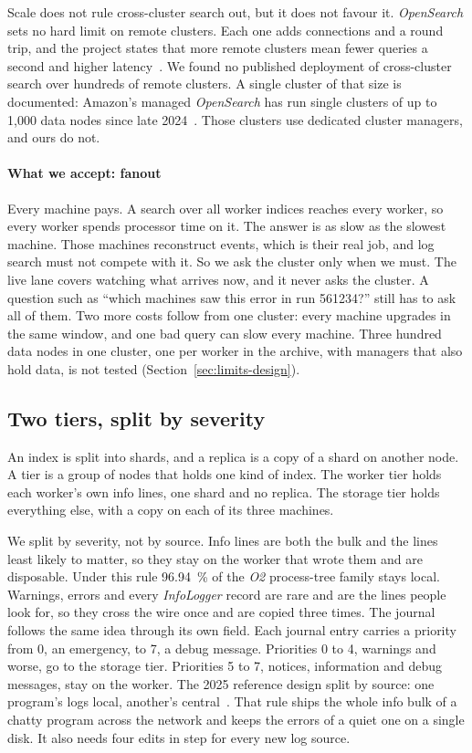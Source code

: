 Scale does not rule cross-cluster search out, but it does not favour it. \textit{OpenSearch} sets no hard limit on remote clusters. Each one adds connections and a round trip, and the project states that more remote clusters mean fewer queries a second and higher latency~\cite{ref:ccsforum}. We found no published deployment of cross-cluster search over hundreds of remote clusters. A single cluster of that size is documented: Amazon's managed \textit{OpenSearch} has run single clusters of up to 1,000 data nodes since late 2024~\cite{ref:aws1000}. Those clusters use dedicated cluster managers, and ours do not.

\paragraph{What we accept: fanout}
Every machine pays. A search over all worker indices reaches every worker, so every worker spends processor time on it. The answer is as slow as the slowest machine. Those machines reconstruct events, which is their real job, and log search must not compete with it. So we ask the cluster only when we must. The live lane covers watching what arrives now, and it never asks the cluster. A question such as ``which machines saw this error in run 561234?'' still has to ask all of them. Two more costs follow from one cluster: every machine upgrades in the same window, and one bad query can slow every machine. Three hundred data nodes in one cluster, one per worker in the archive, with managers that also hold data, is not tested (Section~\ref{sec:limits-design}).

\subsection{Two tiers, split by severity}\label{sec:why-severity}

An index is split into shards, and a replica is a copy of a shard on another node. A tier is a group of nodes that holds one kind of index. The worker tier holds each worker's own info lines, one shard and no replica. The storage tier holds everything else, with a copy on each of its three machines.

We split by severity, not by source. Info lines are both the bulk and the lines least likely to matter, so they stay on the worker that wrote them and are disposable. Under this rule 96.94~\% of the \textit{O2} process-tree family stays local. Warnings, errors and every \textit{InfoLogger} record are rare and are the lines people look for, so they cross the wire once and are copied three times. The journal follows the same idea through its own field. Each journal entry carries a priority from 0, an emergency, to 7, a debug message. Priorities 0 to 4, warnings and worse, go to the storage tier. Priorities 5 to 7, notices, information and debug messages, stay on the worker. The 2025 reference design split by source: one program's logs local, another's central~\cite{ref:papadopoulos2025}. That rule ships the whole info bulk of a chatty program across the network and keeps the errors of a quiet one on a single disk. It also needs four edits in step for every new log source.

